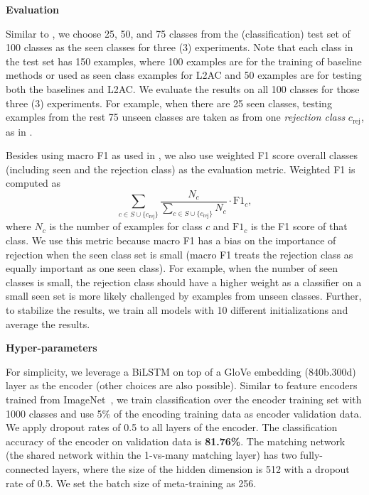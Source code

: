 \textbf{Evaluation}

Similar to \cite{shu-xu-liu:2017:EMNLP2017}, we choose 25, 50, and 75 classes from the (classification) test set of 100 classes as the seen classes for three (3) experiments.
Note that each class in the test set has 150 examples, where 100 examples are for the training of baseline methods or used as seen class examples for L2AC and 50 examples are for testing both the baselines and L2AC.
We evaluate the results on all 100 classes for those three (3) experiments.
For example, when there are 25 seen classes, testing examples from the rest 75 unseen classes are taken as from one \textit{rejection class} $c_\text{rej}$, as in \cite{shu-xu-liu:2017:EMNLP2017}.

Besides using macro F1 as used in \cite{shu-xu-liu:2017:EMNLP2017}, we also use weighted F1 score overall classes (including seen and the rejection class) as the evaluation metric.
Weighted F1 is computed as 
\begin{equation}
\sum_{c\in S\cup\{c_\text{rej}\} } \frac{N_c}{\sum_{c\in S\cup\{c_\text{rej}\}}N_c  }\cdot \text{F1}_c,
\end{equation}
where $N_c$ is the number of examples for class $c$ and $\text{F1}_c$ is the F1 score of that class.
We use this metric because macro F1 has a bias on the importance of rejection when the seen class set is small (macro F1 treats the rejection class as equally important as one seen class).
For example, when the number of seen classes is small, the rejection class should have a higher weight as a classifier on a small seen set is more likely challenged by examples from unseen classes.
Further, to stabilize the results, we train all models with 10 different initializations and average the results.

\textbf{Hyper-parameters}

For simplicity, we leverage a BiLSTM \cite{hochreiter1997long,schuster1997bidirectional} on top of a GloVe \cite{pennington2014glove} embedding (840b.300d) layer as the encoder (other choices are also possible).
Similar to feature encoders trained from ImageNet~\cite{russakovsky2015imagenet}, we train classification over the encoder training set with 1000 classes and use 5\% of the encoding training data as encoder validation data.
We apply dropout rates of 0.5 to all layers of the encoder. 
The classification accuracy of the encoder on validation data is \textbf{81.76\%}.
The matching network (the shared network within the 1-vs-many matching layer) has two fully-connected layers, where the size of the hidden dimension is 512 with a dropout rate of 0.5.
We set the batch size of meta-training as 256.

